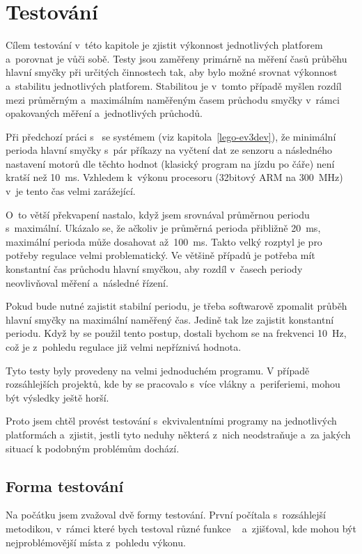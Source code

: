 \chapter{Testování}
\label{testing}

Cílem testování v~této kapitole je zjistit výkonnost jednotlivých platforem a~porovnat je vůči sobě. 
Testy jsou zaměřeny primárně na měření časů průběhu hlavní smyčky při určitých činnostech tak, aby bylo možné srovnat výkonnost a~stabilitu jednotlivých platforem. 
Stabilitou je v~tomto případě myšlen rozdíl mezi průměrným a~maximálním naměřeným časem průchodu smyčky v~rámci opakovaných měření a~jednotlivých průchodů.

Při předchozí práci s~\EVthree{ } se systémem \evThreeDev (viz kapitola~\ref{lego-ev3dev}), že minimální perioda hlavní smyčky s~pár příkazy na vyčtení dat ze senzoru a následného nastavení motorů dle těchto hodnot (klasický program na jízdu po čáře) není kratší než 10~ms. 
Vzhledem k~výkonu procesoru (32bitový ARM na 300~MHz) v~\EVthree{ }je tento čas velmi zarážející. 

O~to větší překvapení nastalo, když jsem srovnával průměrnou periodu s~maximální. Ukázalo se, že ačkoliv je průměrná perioda přibližně 20~ms, maximální perioda může dosahovat až~100~ms. 
Takto velký rozptyl je pro potřeby regulace velmi problematický. 
Ve většině případů je potřeba mít konstantní čas průchodu hlavní smyčkou, aby rozdíl v~časech periody neovlivňoval měření a~následné řízení. 

Pokud bude nutné zajistit stabilní periodu, je třeba softwarově zpomalit průběh hlavní smyčky na maximální naměřený čas. 
Jedině tak lze zajistit konstantní periodu. 
Když by se použil tento postup, dostali bychom se na frekvenci 10~Hz, což je z~pohledu regulace již velmi nepříznivá hodnota.

Tyto testy byly provedeny na velmi jednoduchém programu. 
V případě rozsáhlejších projektů, kde by se pracovalo s~více vlákny a~periferiemi, mohou být výsledky ještě horší.

Proto jsem chtěl provést testování s~ekvivalentními programy na jednotlivých platformách a~zjistit, jestli tyto neduhy některá z~nich neodstraňuje a~za jakých situací k podobným problémům dochází.

\section{Forma testování}

Na počátku jsem zvažoval dvě formy testování. První počítala s~rozsáhlejší metodikou, v~rámci které bych testoval různé funkce \EVthree{}~ a~zjišťoval, kde mohou být nejproblémovější místa z~pohledu výkonu. \\

